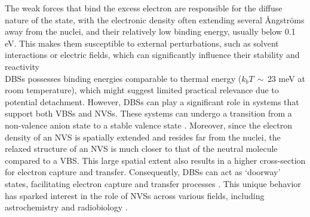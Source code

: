 The weak forces that bind the excess electron are responsible for the diffuse nature of the state, with the electronic density often extending several \r{A}ngstr{\"o}ms away from the nuclei, and their relatively low binding energy, usually below 0.1 eV. This makes them susceptible to external perturbations, such as solvent interactions or electric fields, which can significantly influence their stability and reactivity \cite{schiedt1998anion,jalbout2001dipole,gutowski2002solvated,jordan2003theory,eustis2007photoelectron,simons2008molecular,herbert2015quantum,clarke2025role}\\

DBSs possesses binding energies comparable to thermal energy ($k_bT\,\sim\,23$ meV at room temperature), which might suggest limited practical relevance due to potential detachment. However, DBSs can play a significant role in systems that support both VBSs and NVSs. These systems can undergo a transition from a non-valence anion state to a stable valence state \cite{herbert2015quantum,jordan2003theory}. Moreover, since the electron density of an NVS is spatially extended and resides far from the nuclei, the relaxed structure of an NVS is much closer to that of the neutral molecule compared to a VBS. This large spatial extent also results in a higher cross-section for electron capture and transfer. Consequently, DBSs can act as `doorway' states, facilitating electron capture and transfer processes \cite{hendricks1998dipole,sommerfeld2002coupling,jordan2003theory,sommerfeld2004intramolecular,sommerfeld2005dipole,simons2008molecular,verlet2020role,kang2022state,hassan2022associative,simons2023molecular}. This unique behavior has sparked interest in the role of NVSs across various fields, including astrochemistry \cite{fortenberry2015interstellar} and radiobiology \cite{gu2012interactions,narayanan2023secondary,sedmidubska2024interaction}.\\

